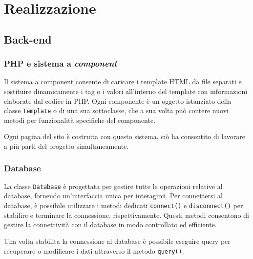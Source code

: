 \section{Realizzazione}

\subsection{Back-end}

\subsubsection{PHP e sistema a \textit{component}}
Il sistema a component consente di caricare i template HTML da file separati e sostituire dinamicamente i tag o i valori all'interno del template con informazioni elaborate dal codice in PHP. Ogni componente è un oggetto istanziato della classe \texttt{Template} o di una sua sottoclasse, che a sua volta può contere nuovi metodi per funzionalità specifiche del componente.

Ogni pagina del sito è costruita con questo sistema, ciò ha consentito di lavorare a più parti del progetto simultaneamente.

\subsubsection{Database}

La classe \texttt{Database} è progettata per gestire tutte le operazioni relative al database, fornendo un'interfaccia unica per interagirci. Per connettersi al database, è possibile utilizzare i metodi dedicati \texttt{connect()} e \texttt{disconnect()} per stabilire e terminare la connessione, rispettivamente. Questi metodi consentono di gestire la connettività con il database in modo controllato ed efficiente.

Una volta stabilita la connessione al database è possibile eseguire query per recuperare o modificare i dati attraverso il metodo \texttt{query()}.

